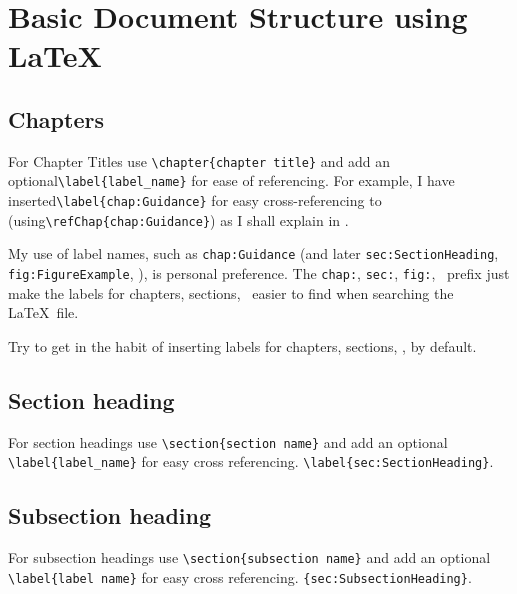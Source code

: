 \documentclass[12pt,oneside]{book} %
\begin{document}
\section{Basic Document Structure using \LaTeX\ }\label{sec:DocumentStructure}
\subsection{Chapters}
For Chapter Titles use \verb#\chapter{chapter title}# and add an optional\linebreak \verb#\label{label_name}# for ease of referencing. For example, I have inserted\linebreak \verb#\label{chap:Guidance}# for easy cross-referencing to  (using\linebreak \verb#\refChap{chap:Guidance}#) as I shall explain in .  

My use of label names, such as \verb#chap:Guidance# (and later \verb#sec:SectionHeading#, \linebreak \verb#fig:FigureExample#, \etc), is personal preference. The \verb#chap:#, \verb#sec:#, \verb#fig:#, \etc\ prefix just make the labels for chapters, sections, \etc\ easier to find when searching the \LaTeX\ file. 

Try to get in the habit of inserting labels for chapters, sections, \etc, by default. 

\subsection{Section heading}
\label{sec:SectionHeading}
For section headings use \verb#\section{section name}# and add an optional \linebreak\verb#\label{label_name}# for easy cross referencing. \eg \verb#\label{sec:SectionHeading}#.

\subsection{Subsection heading}
\label{sec:SubsectionHeading}
For subsection headings use \verb#\section{subsection name}# and add an optional \linebreak\verb#\label{label name}# for easy cross referencing. \eg \verb#{sec:SubsectionHeading}#.
\end{document}
